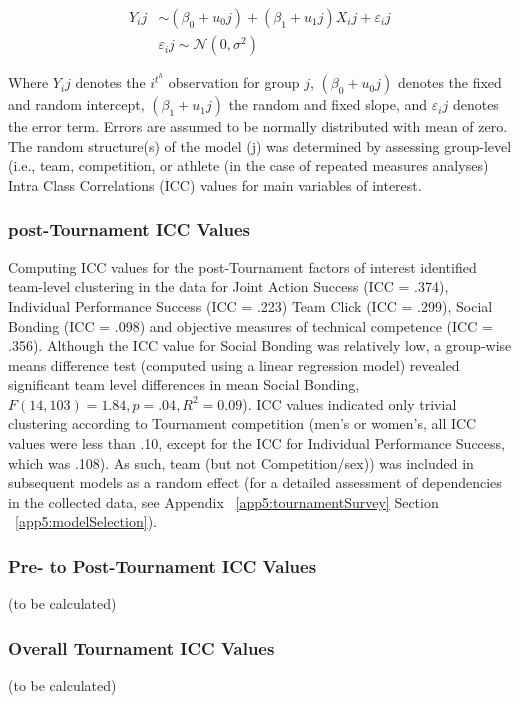    \begin{align*}
      Y_ij & \sim  (\beta_0 + u_0j) + (\beta_1 + u_1j)X_ij + \varepsilon_ij\\
           & \varepsilon_ij \sim \mathcal{N}(0,\sigma^{2})
    \end{align*}


Where $Y_ij$ denotes the $i^t^h$ observation for group $j$, $(\beta_0 + u_0j)$ denotes the fixed and random intercept, $(\beta_1 + u_1j)$ the random and fixed slope, and $\varepsilon_ij$ denotes the error term.  Errors are assumed to be normally distributed with mean of zero.  The random structure(s) of the model (j) was determined by assessing  group-level (i.e., team, competition, or athlete (in the case of repeated measures analyses) Intra Class Correlations (ICC) values for main variables of interest.

\subsubsection{post-Tournament ICC Values}
Computing ICC values for the post-Tournament factors of interest identified team-level clustering in the data for Joint Action Success (ICC = .374), Individual Performance Success (ICC = .223) Team Click (ICC = .299), Social Bonding (ICC = .098) and objective measures of technical competence (ICC = .356). Although the ICC value for Social Bonding was relatively low, a group-wise means difference test (computed using a linear regression model) revealed significant team level differences in mean Social Bonding, $F(14, 103) = 1.84, p = .04, R^2 = 0.09$). ICC values indicated only trivial clustering according to Tournament competition (men's or women's, all ICC values were less than .10, except for the ICC for Individual Performance Success, which was .108).  As such, team (but not Competition/sex)) was included in subsequent models as a random effect (for a detailed assessment of dependencies in the collected data, see Appendix ~\ref{app5:tournamentSurvey} Section ~\ref{app5:modelSelection}).


\subsubsection{Pre- to Post-Tournament ICC Values}
(to be calculated)
\subsubsection{Overall Tournament ICC Values}
(to be calculated)



